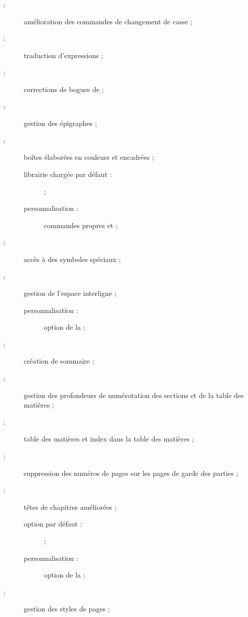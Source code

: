 \begin{description}
\item[ :] amélioration des commandes de changement de
  casse ;
\item[ :] traduction d'expressions ;
\item[ :] corrections de bogues de  ;
\item[ :] gestion des épigraphes ;
\item[ :] boîtes élaborées en couleurs et encadrées ;
  \begin{description}
  \item[librairie chargée par défaut :]  ;
  \item[personnalisation :] commandes propres  et
     ;
  \end{description}
\item[ :] accès à des symboles spéciaux ;
\item[ :] gestion de l'espace interligne ;
  \begin{description}
  \item[personnalisation :] option  de la \yatcl ;
  \end{description}
\item[ :] création de sommaire ;
\item[ :] gestion des profondeurs de numérotation des
  sections et de la table des matières ;
\item[ :] table des matières et index dans la table des
  matières ;
\item[ :] suppression des numéros de pages sur les pages
  de garde des parties ;
\item[ :] têtes de chapitres améliorées ;
  \begin{description}
  \item[option par défaut :]  ;
  \item[personnalisation :] option  de la \yatcl ;
  \end{description}
\item[ :] %
  gestion des styles de pages ;
  \begin{description}

\end{description}
\end{description}
